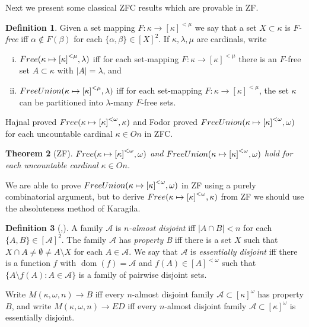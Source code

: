 \documentclass[a4paper,10pt,reqno]{amsart}
\numberwithin{equation}{section}
\newtheorem{theorem}{Theorem}[section]
\theoremstyle{definition}
\newtheorem{definition}[theorem]{Definition}
\theoremstyle{remark}
\newcommand{\mc}[1]{\mathcal{#1}}
\newcommand{\setm}{\setminus}
\newcommand{\empt}{\emptyset}
\newcommand{\subs}{\subset}
\newcommand{\dom}{\operatorname{dom}}
\begin{document}
Next we present  some classical ZFC results which are provable in ZF.

\begin{definition}
    Given a set mapping  $F:{\kappa}\to {[{\kappa}]}^{<{\mu}}$ we say that a set 
    $X\subs {\kappa}$ is {\em $F$-free} iff ${\alpha}\notin F({\beta})$ for each $\{{\alpha},{\beta}\}\in {[X]}^{2}$. 
            If ${\kappa},{\lambda},{\mu}$ are cardinals, write 
           \begin{enumerate}[(i)]
       \item         $Free({{\kappa}}\mapsto {[{{\kappa}}]}^{<{\mu}}, {\lambda})$ iff for each
       set-mapping $F:{\kappa}\to {[{\kappa}]}^{<{\mu}}$ there is an $F$-free  set 
       $A\subs {\kappa}$ with $|A|={\lambda}$, and  
\item   $FreeUnion({{\kappa}}\mapsto {[{{\kappa}}]}^{<{\mu}}, {\lambda})$ iff for each
set-mapping $F:{\kappa}\to {[{\kappa}]}^{<{\mu}}$, the set ${\kappa}$ 
can be partitioned into ${\lambda}$-many  $F$-free  sets.  
       \end{enumerate} 
    \end{definition}
    
    
    
    
    Hajnal \cite{Ha60} proved $Free({\kappa}\mapsto {[{\kappa}]}^{<{\omega}}, {\kappa})$ and 
    Fodor \cite{Fo52} proved $FreeUnion({\kappa}\mapsto {[{\kappa}]}^{<{\omega}}, {\omega})$ 
     for each uncountable  cardinal ${\kappa}\in On$ in ZFC.
 
     \begin{theorem}[ZF]\label{tm:free-union-elementary}
        $Free({\kappa}\mapsto {[{\kappa}]}^{<\omega}, \omega)$ and 
        $FreeUnion({\kappa}\mapsto {[{\kappa}]}^{<\omega}, \omega)$ hold for each uncountable cardinal ${\kappa}\in On $.
        \end{theorem}
    
We are able to  prove $FreeUnion({\kappa}\mapsto {[{\kappa}]}^{<\omega}, \omega)$
in ZF using a purely combinatorial argument, 
but to derive $Free({\kappa}\mapsto {[{\kappa}]}^{<{\omega}}, {\kappa})$ from ZF 
we should use  the absoluteness method of Karagila.

        
    
 
    \begin{definition}[\cite{Mi37},\cite{Ko84}]
        A family $\mc A$ is {\em $n$-almost disjoint} iff $|A\cap B|<n$ for each $\{A,B\}\in {[\mc A]}^{2}$.   
The family $\mc A$ has {\em property B} iff there is a set $X$ such that 
$X\cap A\ne \empt\ne A\setm X$ for each $A\in \mc A$.
        We say that  $\mc A$ is {\em essentially disjoint} iff there is a 
        function $f$ with $\dom(f)=\mc A$ and $f(A)\in [A]^{<{\omega}}$
        such that $\{A\setm f(A):A\in \mc A\}$ is a family of pairwise disjoint sets.    
        
        Write $M({\kappa},{\omega},n)\to B$   iff every $n$-almost disjoint 
        family $\mc A\subs {[{\kappa}]}^{{\omega}}$ has property $B$, and 
       write $M({\kappa},{\omega},n)\to ED$ iff every $n$-almost disjoint 
       family $\mc A\subs {[{\kappa}]}^{{\omega}}$ is essentially disjoint.
       \end{definition}
       
\end{document}
